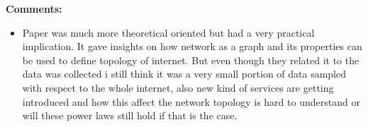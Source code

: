 \documentclass[a4paper,12pt, twoside]{article}
\begin{document}
\textbf{Comments:}
\begin{itemize}
	\item Paper was much more theoretical oriented but had a very practical implication. It gave insights on how network as a graph and its properties can be used to define topology of internet. But even though they related it to the data was collected i still think it was a very small portion of data sampled with respect to the whole internet, also new kind of services are getting introduced and how this affect the network topology is hard to understand or will these power laws still hold if that is the case. 
\end{itemize}
\end{document}
